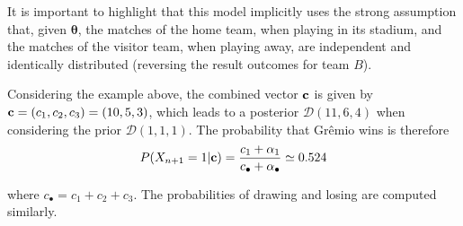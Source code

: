 \documentclass[journal,article,accept,moreauthors,pdftex,12pt,a4paper]{mdpi}
\begin{document}
    It is important to highlight that this model implicitly uses the strong assumption that, given $\boldsymbol{\theta}$, the matches of the home team, when playing in its stadium, and the matches of the visitor team, when playing away, are independent and identically distributed (reversing the result outcomes for team $B$).

    Considering the example above, the combined vector ${\bf c}$ is given by ${\bf c}=(c_1,c_2,c_3)=(10,5,3)$, which leads to a posterior $\mathcal{D}(11,6,4)$ when considering the prior $\mathcal{D}(1,1,1)$.
    The probability that Gr\^emio wins is therefore
    \[P(X_{n+1}=1|{\bf c})=\frac{c_1+\alpha_1}{c_{\bullet}+\alpha_{\bullet}}\simeq0.524
    \]

    \noindent
    where $c_{\bullet}=c_1+c_2+c_3$. The probabilities of drawing and losing are computed similarly.
\end{document}
